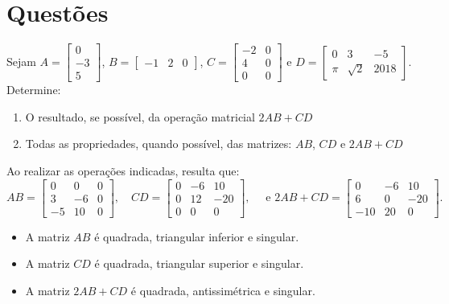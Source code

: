 \documentclass[12pt,a4paper]{article}
\begin{document}
\section*{Questões}
\begin{ExerciseList}
\Exercise[title={2,0}] Sejam
$A = \begin{bmatrix}
0\\-3\\5
\end{bmatrix}$,
$B = \begin{bmatrix}
-1 & 2 & 0
\end{bmatrix}$,
$C = \begin{bmatrix}
-2 & 0 \\
 4 & 0 \\
 0 & 0
\end{bmatrix}$
e
$D = \begin{bmatrix}
0 & 3 & -5 \\
\pi & \sqrt{2} & 2018
\end{bmatrix}$. Determine:
\begin{enumerate}
\item O resultado, se possível, da operação matricial $2AB+CD$
\item Todas as propriedades, quando possível, das matrizes: $AB$, $CD$ e $2AB+CD$
\end{enumerate}
\Answer Ao realizar as operações indicadas, resulta que:
\[
AB =
\begin{bmatrix}
 0 & 0 & 0 \\
 3 & -6 & 0 \\
-5 & 10 & 0
\end{bmatrix},\quad
CD =
\begin{bmatrix}
0 & -6 &  10 \\
0 & 12 & -20 \\
0 &  0 &   0
\end{bmatrix},\quad \text{ e }
2AB+CD
=\begin{bmatrix}
  0 & -6 &  10\\
  6 &  0 & -20\\
-10 & 20 &   0
\end{bmatrix}.
\]
\begin{itemize}
\item A matriz $AB$ é quadrada, triangular inferior e singular.
\item A matriz $CD$ é quadrada, triangular superior e singular.
\item A matriz $2AB+CD$ é quadrada, antissimétrica e singular.
\end{itemize}


\end{ExerciseList}
\end{document}
